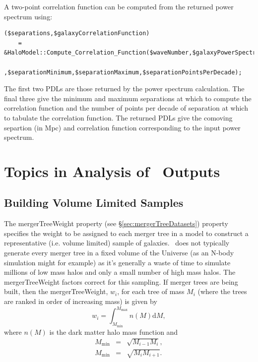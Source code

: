 A two-point correlation function can be computed from the returned power spectrum using:
\begin{verbatim}
($separations,$galaxyCorrelationFunction) 
    = &HaloModel::Compute_Correlation_Function($waveNumber,$galaxyPowerSpectrum
        ,$separationMinimum,$separationMaximum,$separationPointsPerDecade);
\end{verbatim}
The first two PDLs are those returned by the power spectrum calculation. The final three give the minimum and maximum separations at which to compute the correlation function and the number of points per decade of separation at which to tabulate the correlation function. The returned PDLs give the comoving separtion (in Mpc) and correlation function corresponding to the input power spectrum.

\section{Topics in Analysis of \glc\ Outputs}

\subsection{Building Volume Limited Samples}\label{sec:volumeLimitedSamples}

The {\normalfont \ttfamily mergerTreeWeight} property (see \S\ref{sec:mergerTreeDatasets}) property specifies the weight to be assigned to each merger tree in a model to construct a representative (i.e. volume limited) sample of galaxies. \glc\ does not typically generate every merger tree in a fixed volume of the Universe (as an N-body simulation might for example) as it's generally a waste of time to simulate millions of low mass halos and only a small number of high mass halos. The {\normalfont \ttfamily mergerTreeWeight} factors correct for this sampling. If merger trees are being built, then the {\normalfont \ttfamily mergerTreeWeight}, $w_i$, for each tree of mass $M_i$ (where the trees are ranked in order of increasing mass) is given by
\begin{equation}
 w_i = \int_{M_\mathrm{min}}^{M_\mathrm{max}} n(M) \mathrm{d}M,
\end{equation}
where $n(M)$ is the dark matter halo mass function and
\begin{eqnarray}
 M_\mathrm{min} &=& \sqrt{M_{i-1}M_i}, \\
 M_\mathrm{min} &=& \sqrt{M_i M_{i+1}}.
\end{eqnarray}

